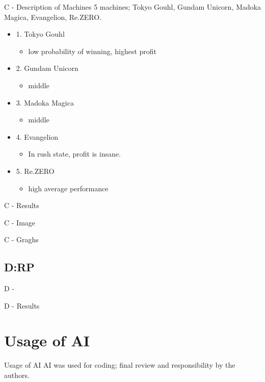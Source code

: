 \documentclass{beamer}
\begin{document}
\begin{frame}{C - Description of Machines}
5 machines; Tokyo Gouhl, Gundam Unicorn, Madoka Magica, Evangelion, Re.ZERO.
\begin{itemize}
    \item 1. Tokyo Gouhl
    \begin{itemize}
        \item low probability of winning, highest profit
    \end{itemize}
    \item 2. Gundam Unicorn
    \begin{itemize}
        \item middle
    \end{itemize}
    \item 3. Madoka Magica 
    \begin{itemize}
        \item middle
    \end{itemize}
    \item 4. Evangelion
    \begin{itemize}
        \item In rush state, profit is insane.
    \end{itemize}
    \item 5. Re.ZERO
    \begin{itemize}
        \item high average performance
    \end{itemize}
\end{itemize}
\end{frame}

\begin{frame}{C - Results}

    
\end{frame}


\begin{frame}{C - Image}
    
\end{frame}

\begin{frame}{C - Graghs}

    
\end{frame}



\subsection{D:RP}
\begin{frame}{D -}
    
\end{frame}

\begin{frame}{D - Results}

    
\end{frame}

\section{Usage of AI}
\begin{frame}{Usage of AI}
    AI was used for coding; final review and responsibility by the authors.
\end{frame}
\end{document}
